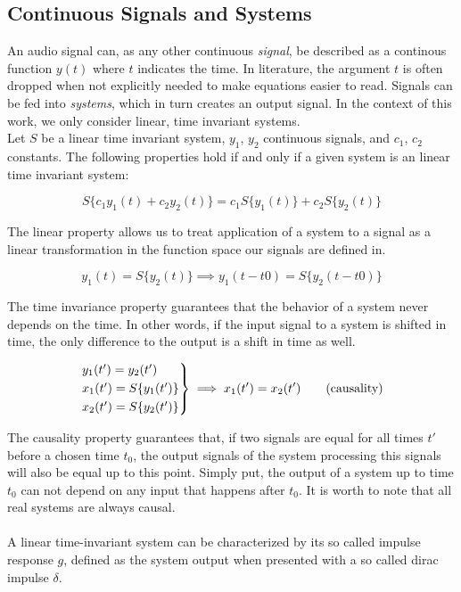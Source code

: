 \subsection{Continuous Signals and Systems}

An audio signal can, as any other continuous \textit{signal}, be described as a continous function $y(t)$ where $t$ indicates the time. In literature, the argument $t$ is often dropped  when not explicitly needed to make equations easier to read.  
Signals can be fed into \textit{systems}, which in turn creates an output signal. In the context of this work, we only consider linear, time invariant systems. 
\\
Let $S$ be a linear time invariant system, $y_1$, $y_2$ continuous signals, and $c_1$, $c_2$ constants. The following properties hold if and only if a given system is an linear time invariant system: 

\[S\{c_1 y_1(t) + c_2 y_2(t)\} = c_1 S\{y_1(t)\} + c_2 S\{y_2(t)\} \tag{linearity}\]

The linear property allows us to treat application of a system to a signal as a linear transformation in the function space our signals are defined in. 

\[y_1(t) = S\{y_2(t)\} \implies y_1(t - t0) = S\{y_2(t - t0)\} \tag{time invariance}\]

The time invariance property guarantees that the behavior of a system never depends on the time. In other words, if the input signal to a system is shifted in time, the only difference to the output is a shift in time as well.

\[
\begin{rcases*}
y_1(t') = y_2(t') \\
x_1(t') = S\{y_1(t')\} \\ 
x_2(t') = S\{y_2(t')\} \\
\end{rcases*} \implies x_1(t') = x_2(t') \tag{causality}\]

The causality property guarantees that, if two signals are equal for all times $t'$ before a chosen time $t_0$, the output signals of the system processing this signals will also be equal up to this point. Simply put, the output of a system up to time $t_0$ can not depend on any input that happens after $t_0$. It is worth to note that all real systems are always causal. 
\\ \\
A linear time-invariant system can be characterized by its so called impulse response $g$, defined as the system output when presented with a so called dirac impulse $\delta$.

